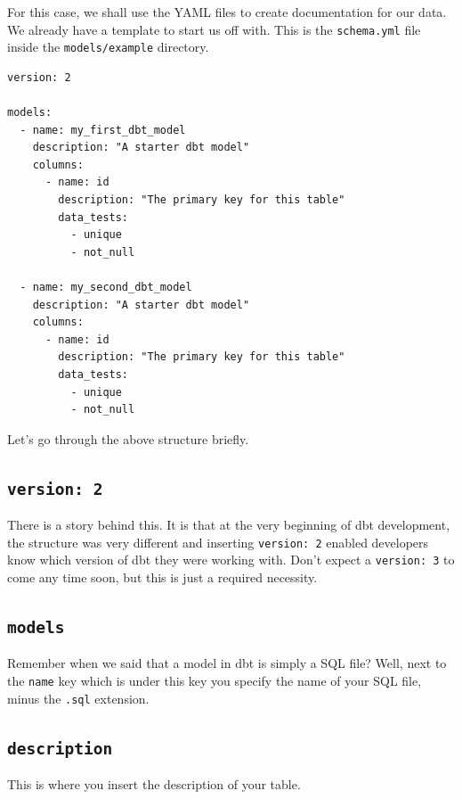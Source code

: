 \documentclass[
]{book}
\begin{document}
For this case, we shall use the YAML files to create documentation for our data. We already have a template to start us off with. This is the \texttt{schema.yml} file inside the \texttt{models/example} directory.

\begin{verbatim}
version: 2

models:
  - name: my_first_dbt_model
    description: "A starter dbt model"
    columns:
      - name: id
        description: "The primary key for this table"
        data_tests:
          - unique
          - not_null

  - name: my_second_dbt_model
    description: "A starter dbt model"
    columns:
      - name: id
        description: "The primary key for this table"
        data_tests:
          - unique
          - not_null
\end{verbatim}

Let's go through the above structure briefly.

\hypertarget{version-2}{%
\subsection{\texorpdfstring{\texttt{version:\ 2}}{version: 2}}\label{version-2}}

There is a story behind this. It is that at the very beginning of dbt development, the structure was very different and inserting \texttt{version:\ 2} enabled developers know which version of dbt they were working with. Don't expect a \texttt{version:\ 3} to come any time soon, but this is just a required necessity.

\hypertarget{models-2}{%
\subsection{\texorpdfstring{\texttt{models}}{models}}\label{models-2}}

Remember when we said that a model in dbt is simply a SQL file? Well, next to the \texttt{name} key which is under this key you specify the name of your SQL file, minus the \texttt{.sql} extension.

\hypertarget{description}{%
\subsection{\texorpdfstring{\texttt{description}}{description}}\label{description}}

This is where you insert the description of your table.
\end{document}

